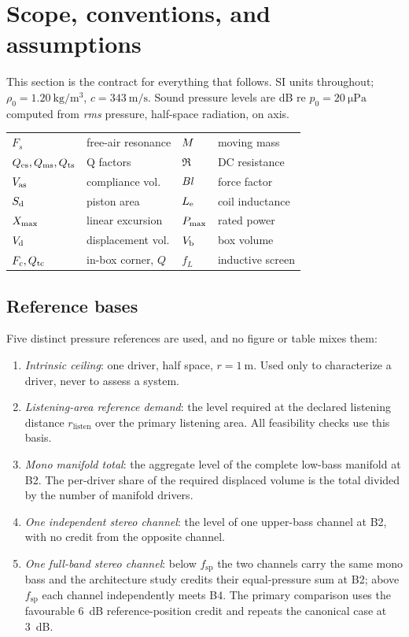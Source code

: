 \section{Scope, conventions, and assumptions}
\label{sec:scope}

This section is the contract for everything that follows. SI units
throughout; $\rho_0=\SI{1.20}{\kilogram\per\cubic\meter}$,
$c=\SI{343}{\meter\per\second}$. Sound pressure levels are dB re
$p_0=\SI{20}{\micro\pascal}$ computed from \emph{rms} pressure, half-space
radiation, on axis.

\begin{center}
	\small
	\begin{tabular}{@{}llll@{}}
	\toprule
		$F_s$ & free-air resonance & $M$ & moving mass\\
		$Q_{\mathrm{es}},Q_{\mathrm{ms}},Q_{\mathrm{ts}}$ & Q factors & $\Re$ & DC resistance\\
		$V_{\mathrm{as}}$ & compliance vol. & $Bl$ & force factor\\
		$S_{\mathrm{d}}$ & piston area & $L_{\mathrm{e}}$ & coil inductance\\
		$X_{\mathrm{max}}$ & linear excursion & $P_{\mathrm{max}}$ & rated power\\
		$V_{\mathrm{d}}$ & displacement vol. & $V_{\mathrm{b}}$ & box volume\\
		$F_c,Q_{\mathrm{tc}}$ & in-box corner, $Q$ & $f_L$ & inductive screen\\
	\bottomrule
	\end{tabular}
\end{center}

\subsection{Reference bases}
\label{sec:scope-bases}

Five distinct pressure references are used, and no figure or table mixes
them:

\begin{enumerate}
\item[B1.] \emph{Intrinsic ceiling}: one driver, half space,
	$r=\SI{1}{\meter}$. Used only to characterize a driver, never to assess
	a system.
\item[B2.] \emph{Listening-area reference demand}: the level required at the
	declared listening distance $r_{\mathrm{listen}}$ over the primary
	listening area. All feasibility checks use this basis.
\item[B3.] \emph{Mono manifold total}: the aggregate level of the complete
	low-bass manifold at B2. The per-driver share of the required displaced
	volume is the total divided by the number of manifold drivers.
\item[B4.] \emph{One independent stereo channel}: the level of one
	upper-bass channel at B2, with no credit from the opposite channel.
\item[B5.] \emph{One full-band stereo channel}: below $f_{\mathrm{sp}}$
	the two channels carry the same mono bass and the architecture study
	credits their equal-pressure sum at B2; above $f_{\mathrm{sp}}$ each
	channel independently meets B4. The primary comparison uses the
	favourable \SI{6}{dB} reference-position credit and repeats the
	canonical case at \SI{3}{dB}.
\end{enumerate}

